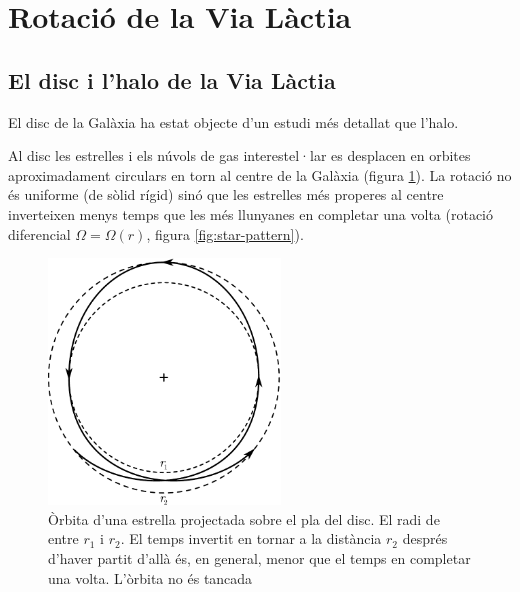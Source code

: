 \section{Rotació de la Via Làctia}
\subsection{El disc i l'halo de la Via Làctia}
El disc de la Galàxia ha estat objecte d'un estudi més detallat que l'halo.

Al disc les estrelles i els núvols de gas interestel·lar es desplacen en orbites aproximadament circulars en torn al centre de la Galàxia (figura \ref{fig:orbit-star}). La rotació no és uniforme (de sòlid rígid) sinó que les estrelles més properes al centre inverteixen menys temps que les més llunyanes en completar una volta (rotació diferencial $\Omega = \Omega(r)$, figura \ref{fig:star-pattern}).

\begin{figure}[h]
	\centering
	\includegraphics[width=0.55\textwidth]{./images/7-orbit-star}
	\caption{Òrbita d'una estrella projectada sobre el pla del disc. El radi de entre $r_{1}$ i $r_{2}$. El temps invertit en tornar a la distància $r_{2}$ després d'haver partit d'allà és, en general, menor que el temps en completar una volta. L'òrbita no és tancada}
	\label{fig:orbit-star}
\end{figure}

